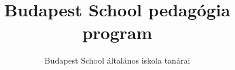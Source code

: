 \documentclass[magyar,12pt,a4paper,draft]{report}
\begin{document}
\newif\ifkerettanterv
\kerettantervfalse

\title{Budapest School pedagógia program}
\author{Budapest School általános iskola tanárai}
\maketitle



\listoftodos[Notes]

\tableofcontents
\newpage
 





{}
\label{sec:bibliographyk}

\end{document}
